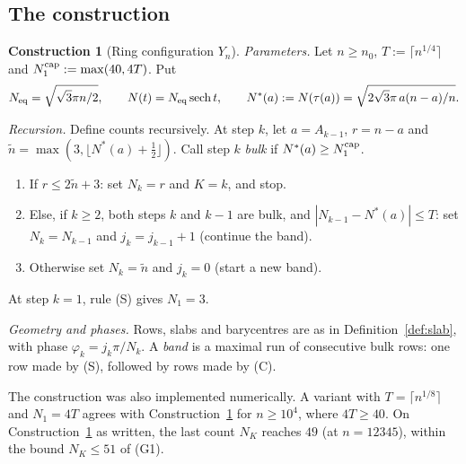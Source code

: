 \documentclass[11pt]{article}
\theoremstyle{definition}
\newtheorem{construction}[theorem]{Construction}
\theoremstyle{remark}
\begin{document}
\subsection{The construction}

\begin{construction}[Ring configuration $Y_n$]\label{con:rings}
\emph{Parameters.} Let $n\ge n_0$, $T:=\lceil n^{1/4}\rceil$ and $N_1^{\rm cap}:=\max(40,4T)$. Put
\[
N_{\rm eq}=\sqrt{\sqrt3\pi n/2},\qquad N(t)=N_{\rm eq}\operatorname{sech}t,\qquad
N^*(a):=N(\tau(a))=\sqrt{2\sqrt3\pi\,a(n-a)/n}.
\]

\emph{Recursion.} Define counts recursively. At step $k$, let $a=A_{k-1}$, $r=n-a$ and
$\tilde n=\max(3,\lfloor N^*(a)+\tfrac12\rfloor)$. Call step $k$ \emph{bulk} if
$N^*(a)\ge N_1^{\rm cap}$.
\begin{enumerate}[label=(\Alph*)]
\item[(F)] If $r\le2\tilde n+3$: set $N_k=r$ and $K=k$, and stop.
\item[(C)] Else, if $k\ge2$, both steps $k$ and $k-1$ are bulk, and $|N_{k-1}-N^*(a)|\le T$: set
  $N_k=N_{k-1}$ and $j_k=j_{k-1}+1$ (continue the band).
\item[(S)] Otherwise set $N_k=\tilde n$ and $j_k=0$ (start a new band).
\end{enumerate}
At step $k=1$, rule (S) gives $N_1=3$.

\emph{Geometry and phases.} Rows, slabs and barycentres are as in Definition~\ref{def:slab}, with
phase $\varphi_k=j_k\pi/N_k$. A \emph{band} is a maximal run of consecutive bulk rows: one row made
by (S), followed by rows made by (C).
\end{construction}

The construction was also implemented numerically. A variant with $T=\lceil n^{1/8}\rceil$ and $N_1=4T$
agrees with Construction~\ref{con:rings} for $n\ge10^4$, where $4T\ge40$. On
Construction~\ref{con:rings} as written, the last count $N_K$ reaches $49$ (at $n=12345$),
within the bound $N_K\le51$ of (G1).
\end{document}
